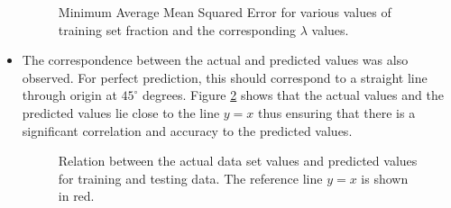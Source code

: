 \documentclass{article}
\begin{document}
\begin{itemize}
\begin{figure}[!h]
 \caption{Minimum Average Mean Squared Error for various values of training set fraction and the corresponding $\lambda$ values.}
 \label{fig:5}
 \end{figure}
 
\item The correspondence between the actual and predicted values was also observed. For perfect prediction, this should correspond to a straight line through origin at $45^\circ$ degrees. Figure \ref{fig:6} shows that the actual values and the predicted values lie close to the line $y=x$ thus ensuring that there is a significant correlation and accuracy to the predicted values.

\begin{figure}[!h]
 \caption{Relation between the actual data set values and predicted values for training and testing data. The reference line $y=x$ is shown in red.}
 \label{fig:6}
 \end{figure}
 
\end{itemize}
\end{document}
